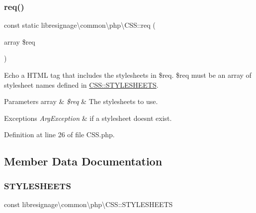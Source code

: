 \subsubsection{\texorpdfstring{req()}{req()}}
{\footnotesize\ttfamily const static libresignage\textbackslash{}common\textbackslash{}php\textbackslash{}\+C\+S\+S\+::req (\begin{DoxyParamCaption}\item[{array}]{\$req }\end{DoxyParamCaption})\hspace{0.3cm}{\ttfamily [static]}}

Echo a H\+T\+ML tag that includes the stylesheets in \$req. \$req must be an array of stylesheet names defined in \hyperlink{classlibresignage_1_1common_1_1php_1_1CSS_ace19c98028bcef21f8366e786ff7bd05}{C\+S\+S\+::\+S\+T\+Y\+L\+E\+S\+H\+E\+E\+TS}.


\begin{DoxyParams}[1]{Parameters}
array & {\em \$req} & The stylesheets to use. \\
\hline
\end{DoxyParams}

\begin{DoxyExceptions}{Exceptions}
{\em Arg\+Exception} & if a stylesheet doesn\textquotesingle{}t exist. \\
\hline
\end{DoxyExceptions}


Definition at line 26 of file C\+S\+S.\+php.



\subsection{Member Data Documentation}
\mbox{\label{classlibresignage_1_1common_1_1php_1_1CSS_ace19c98028bcef21f8366e786ff7bd05}} 
\subsubsection{\texorpdfstring{S\+T\+Y\+L\+E\+S\+H\+E\+E\+TS}{STYLESHEETS}}
{\footnotesize\ttfamily const libresignage\textbackslash{}common\textbackslash{}php\textbackslash{}\+C\+S\+S\+::\+S\+T\+Y\+L\+E\+S\+H\+E\+E\+TS}

